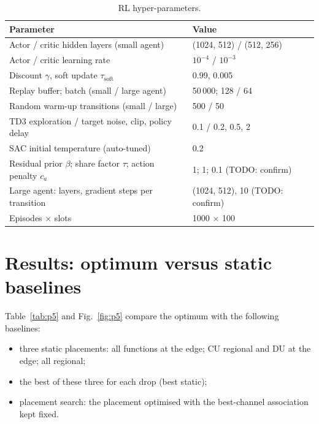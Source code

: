 \documentclass[11pt,oneside]{report}
\begin{document}
\begin{table}[H]
	\centering
	\caption{RL hyper-parameters.}\label{tab:rl}
	\begin{tabular}{p{8.5cm}p{5.5cm}}
		\toprule
		Parameter & Value \\
		\midrule
		Actor / critic hidden layers (small agent) & (1024, 512) / (512, 256) \\
		Actor / critic learning rate & $10^{-4}$ / $10^{-3}$ \\
		Discount $\gamma$, soft update $\tau_{\text{soft}}$ & 0.99, 0.005 \\
		Replay buffer; batch (small / large agent) & 50\,000; 128 / 64 \\
		Random warm-up transitions (small / large) & 500 / 50 \\
		TD3 exploration / target noise, clip, policy delay & 0.1 / 0.2, 0.5, 2 \\
		SAC initial temperature (auto-tuned) & 0.2 \\
		Residual prior $\beta$; share factor $\tau$; action penalty $c_a$ & 1; 1; 0.1 \quad (TODO: confirm) \\
		Large agent: layers, gradient steps per transition & (1024, 512), 10 \quad (TODO: confirm) \\
		Episodes $\times$ slots & 1000 $\times$ 100 \\
		\bottomrule
	\end{tabular}
\end{table}

\section{Results: optimum versus static baselines}\label{sec:res_opt}
Table~\ref{tab:p5} and Fig.~\ref{fig:p5} compare the optimum with the following baselines:
\begin{itemize}
	\item three static placements: all functions at the edge; CU regional and DU at the edge; all regional;
	\item the best of these three for each drop (best static);
	\item placement search: the placement optimised with the best-channel association kept fixed.
\end{itemize}
\end{document}
